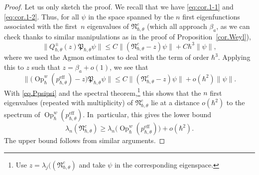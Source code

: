 \documentclass[10pt]{amsart}
\newcommand{\eff}{\mathrm{eff}}
\DeclareMathOperator{\Op}{Op}
\theoremstyle{plain}
\theoremstyle{definition}
\begin{document}
\begin{proof}
Let us only sketch the proof. We recall that we have \eqref{eq:cor.1-1} and \eqref{eq:cor.1-2}. Thus, for all $\psi$ in the space spanned by the $n$ first eigenfunctions associated with the first~$n$ eigenvalues of $\mathfrak{N}^c_{\hbar,\theta}$ (which all approach $\beta_a$, as we can check thanks to similar manipulations as in the proof of Proposition~\ref{cor.Weyl}),
\[
\|Q_{\hbar,\theta}^\pm(z)\mathfrak{P}_{\hbar,\theta}\psi\|\leq C\|(\mathfrak{N}_{\hbar,\theta}^c-z)\psi\|+C\hbar^3\|\psi\|,
\]
where we used the Agmon estimates to deal with the term of order $\hbar^3$. Applying this to $z$ such that $z=\beta_a+o(1)$, we see that
\[
\|\bigl(\Op^w_\hbar (p^{\eff}_{\hbar,\theta})-z\bigr)\mathfrak{P}_{\hbar,\theta}\psi\|\leq C\|(\mathfrak{N}_{\hbar,\theta}^c-z)\psi\|+o(\hbar^2)\|\psi\|.
\]
With \eqref{eq.Ppsipsi} and the spectral theorem,\footnote{Use $z=\lambda_j((\mathfrak{N}_{\hbar,\theta}^c)$ and take $\psi$ in the corresponding eigenspace.} this shows that the $n$ first eigenvalues (repea\-ted with multiplicity) of $\mathfrak{N}_{\hbar,\theta}^c$ lie at a distance $o(\hbar^2)$ to the spectrum of $\Op^w_\hbar (p^{\eff}_{\hbar,\theta})$. In~particular, this gives the lower bound
\[
\lambda_n(\mathfrak{N}^c_{\hbar,\theta})\geq\lambda_n\bigl(\Op^w_\hbar (p^{\eff}_{\hbar,\theta})\bigr)+o(\hbar^{2}).
\]
The upper bound follows from similar arguments.
\end{proof}
\end{document}
